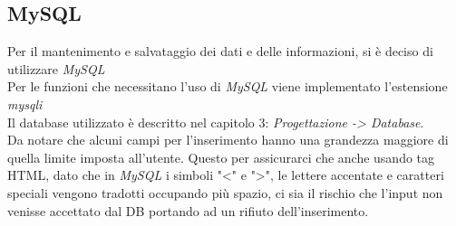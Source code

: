\subsection{MySQL}
Per il mantenimento e salvataggio dei dati e delle informazioni, si è deciso di utilizzare \emph{MySQL}\\
Per le funzioni che necessitano l'uso di \emph{MySQL} viene implementato l'estensione \emph{mysqli}\\
Il database utilizzato è descritto nel capitolo 3: \emph{Progettazione -> Database}.
\\
Da notare che alcuni campi per l'inserimento hanno una grandezza maggiore di quella limite imposta all'utente. 
Questo per assicurarci che anche usando tag HTML, dato che in \emph{MySQL} i simboli "<" e ">", le lettere accentate e caratteri speciali vengono tradotti occupando più spazio, ci sia il rischio che l'input non venisse accettato dal DB portando ad un rifiuto dell'inserimento.